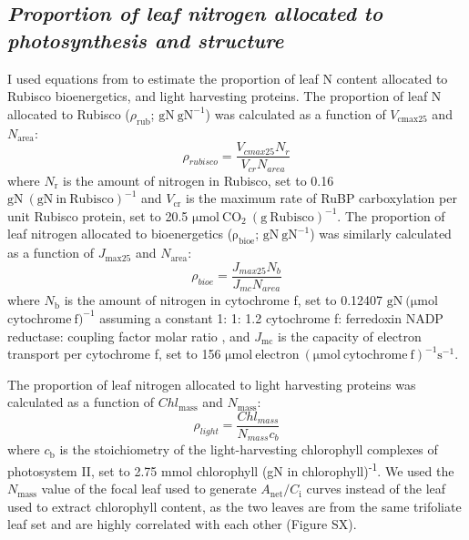 \subsection{\textit{Proportion of leaf nitrogen allocated to photosynthesis and structure}}
I used equations from  to estimate the proportion of leaf N content allocated to Rubisco bioenergetics, and light harvesting proteins. The proportion of leaf N allocated to Rubisco ($\rho_\mathrm{{rub}}$; $\mathrm{gN\ gN^{-1}}$) was calculated as a function of $V_\mathrm{cmax25}$ and $N_\mathrm{area}$: 
\begin{equation} \label{eqn_5.6}
    \rho_{rubisco}=\frac{V_{cmax25}N_r}{V_{cr}N_{area}}
\end{equation}
\noindent where $N_\mathrm{r}$ is the amount of nitrogen in Rubisco, set to 0.16 $\mathrm{gN\ (gN\ in\ Rubisco)^{-1}}$ and $V_\mathrm{cr}$ is the maximum rate of RuBP carboxylation per unit Rubisco protein, set to 20.5 $\mathrm{\mu mol\ CO_2\ (g\ Rubisco)^{-1}}$. The proportion of leaf nitrogen allocated to bioenergetics ($\mathrm{\rho_{bioe}}$; $\mathrm{gN\ gN^{-1}}$) was similarly calculated as a function of $J_\mathrm{max25}$ and $N_\mathrm{area}$:
\begin{equation} \label{eqn_5.7}
    \rho_{bioe}=\frac{J_{max25}N_b}{J_{mc}N_{area}}
\end{equation}
\noindent where $N_\mathrm{b}$ is the amount of nitrogen in cytochrome f, set to 0.12407 $\mathrm{gN\ (\mu mol}$ $\mathrm{cytochrome\ f)^{-1}}$ assuming a constant 1: 1: 1.2 cytochrome f: ferredoxin NADP reductase: coupling factor molar ratio , and $J_\mathrm{mc}$ is the capacity of electron transport per cytochrome f, set to 156 $\mathrm{\mu mol\ electron\ (\mu mol\ cytochrome\ f)^{-1} s^{-1}}$.

The proportion of leaf nitrogen allocated to light harvesting proteins was calculated as a function of $Chl_\mathrm{{mass}}$ and $N_\mathrm{{mass}}$:
\begin{equation} \label{eqn_5.8}
    \rho_{light}=\frac{Chl_{mass}}{N_{mass}c_{b}}
\end{equation}
\noindent where $c_\mathrm{{b}}$ is the stoichiometry of the light-harvesting chlorophyll complexes of photosystem II, set to 2.75 $\mathrm{mmol}$ chlorophyll (gN in chlorophyll)\textsuperscript{-1}. We used the $N_\mathrm{{mass}}$ value of the focal leaf used to generate $A_\mathrm{{net}}/C_\mathrm{i}$ curves instead of the leaf used to extract chlorophyll content, as the two leaves are from the same trifoliate leaf set and are highly correlated with each other (Figure SX).

